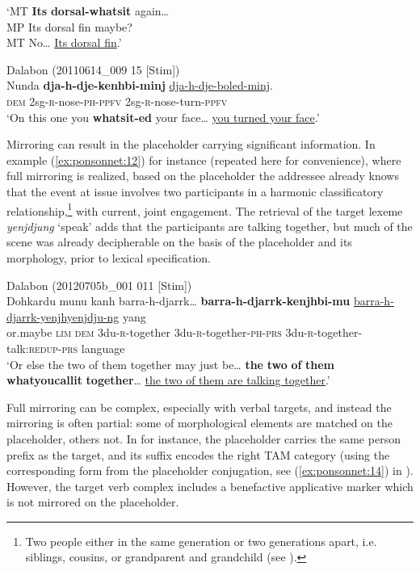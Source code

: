 \documentclass[output=paper]{langscibook}
\begin{document}
\glt ‘MT  \textbf{Its} \textbf{dorsal-whatsit} again…\\
MP  Its dorsal fin maybe? \\
  MT  No… \uline{Its dorsal fin}.’
\z 


\ea
{\label{ex:ponsonnet:16}Dalabon (20110614\_009 15 [Stim])}\\
\gll Nunda   \textbf{dja-h-dje-kenhbi-minj}  \uline{dja-h-dje-boled-minj}.\\
\textsc{dem} \textup{2sg-}\textsc{r}\textup{{}-nose-}\textsc{ph}\textup{{}-}\textsc{ppfv} \textup{2sg-}\textsc{r}\textup{{}-nose-turn-}\textsc{ppfv}\\
\glt ‘On this one you \textbf{whatsit-ed} your face… \uline{you turned your face}.’
\z 

Mirroring can result in the placeholder carrying significant information. In example (\ref{ex:ponsonnet:12}) for instance (repeated here for convenience), where full mirroring is realized, based on the placeholder the addressee already knows that the event at issue involves two participants in a harmonic classificatory relationship,\footnote{Two people either in the same generation or two generations apart, i.e. siblings, cousins, or grandparent and grandchild (see \citealt{EvansEvans2001}).} with current, joint engagement. The retrieval of the target lexeme \textit{yenjdjung} ‘speak’ adds that the participants are talking together, but much of the scene was already decipherable on the basis of the placeholder and its morphology, prior to lexical specification.

\begin{exe}
{Dalabon (20120705b\_001 011 [Stim])}\\
\gll Dohkardu  munu   kanh  barra-h-djarrk… \textbf{barra-h-djarrk-kenjhbi-mu} \uline{barra-h-djarrk-yenjhyenjdju-ng}   yang\\
\textup{or.maybe} \textsc{lim} \textsc{dem} \textup{3du-}\textsc{r}\textup{{}-together} \textup{3du-}\textsc{r}\textup{{}-together}\textsc{{}-ph}\textup{{}-}\textsc{prs} \textup{3du-}\textsc{r}\textup{{}-together-talk:}\textsc{redup-prs} \textup{language}\\
\glt ‘Or else the two of them together may just be… \textbf{the} \textbf{two} \textbf{of} \textbf{them} \textbf{whatyoucallit} \textbf{together}… \uline{the two of them are talking together}.’
\end{exe}

Full mirroring can be complex, especially with verbal targets, and instead the mirroring is often partial: some of morphological elements are matched on the placeholder, others not. In  for instance, the placeholder carries the same person prefix as the target, and its suffix encodes the right TAM category (using the corresponding form from the placeholder conjugation, see (\ref{ex:ponsonnet:14}) in ). However, the target verb complex includes a benefactive applicative marker which is not mirrored on the placeholder. 
\end{document}
